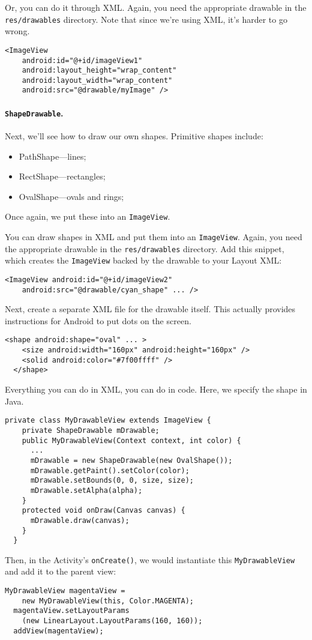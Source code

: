 Or, you can do it through XML. Again, you need the appropriate
drawable in the {\tt res/drawables} directory. Note that since we're
using XML, it's harder to go wrong.

\begin{lstlisting}[basicstyle=\scriptsize]
  <ImageView
    android:id="@+id/imageView1"
    android:layout_height="wrap_content"
    android:layout_width="wrap_content"
    android:src="@drawable/myImage" />
\end{lstlisting}

\paragraph{{\tt ShapeDrawable}.} Next, we'll see how to draw our own shapes.
Primitive shapes include:
\begin{itemize}
\item PathShape---lines;
\item RectShape---rectangles;
\item OvalShape---ovals and rings;
\end{itemize}
Once again, we put these into an {\tt ImageView}.

You can draw shapes in XML and put them into an {\tt ImageView}.
Again, you need the appropriate drawable in the {\tt res/drawables}
directory.  Add this snippet, which creates the {\tt ImageView} backed
by the drawable to your Layout XML:
\begin{lstlisting}[basicstyle=\scriptsize]
  <ImageView android:id="@+id/imageView2"
    android:src="@drawable/cyan_shape" ... />
\end{lstlisting}
Next, create a separate XML file for the drawable itself. This actually
provides instructions for Android to put dots on the screen.
\begin{lstlisting}[basicstyle=\scriptsize]
  <shape android:shape="oval" ... >
    <size android:width="160px" android:height="160px" />
    <solid android:color="#7f00ffff" />
  </shape>
\end{lstlisting}

Everything you can do in XML, you can do in code. Here, we
specify the shape in Java.
\begin{lstlisting}[basicstyle=\scriptsize]
  private class MyDrawableView extends ImageView {
    private ShapeDrawable mDrawable;
    public MyDrawableView(Context context, int color) {
      ...
      mDrawable = new ShapeDrawable(new OvalShape());
      mDrawable.getPaint().setColor(color);
      mDrawable.setBounds(0, 0, size, size);
      mDrawable.setAlpha(alpha);
    }
    protected void onDraw(Canvas canvas) {
      mDrawable.draw(canvas);
    }
  }
\end{lstlisting}
Then, in the Activity's {\tt onCreate()}, we would instantiate
this {\tt MyDrawableView} and add it to the parent view:
\begin{lstlisting}[basicstyle=\scriptsize]
  MyDrawableView magentaView = 
    new MyDrawableView(this, Color.MAGENTA);
  magentaView.setLayoutParams
    (new LinearLayout.LayoutParams(160, 160));
  addView(magentaView);
\end{lstlisting}




